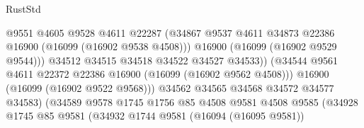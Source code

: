 \begin{lexlean}{RustStd}
\begin{coremodule}
                                              @9551
                                              @4605
                                              @9528
                                              @4611
                                              @22287
                                              (@34867
                                                @9537
                                                @4611
                                                @34873
                                                @22386
                                                @16900
                                                (@16099 (@16902 @9538 @4508)))
                                              @16900
                                              (@16099 (@16902 @9529 @9544)))
                                            @34512
                                            @34515
                                            @34518
                                            @34522
                                            @34527
                                            @34533))
                                        (@34544
                                          @9561
                                          @4611
                                          @22372
                                          @22386
                                          @16900
                                          (@16099 (@16902 @9562 @4508)))
                                        @16900
                                        (@16099 (@16902 @9522 @9568)))
                                      @34562
                                      @34565
                                      @34568
                                      @34572
                                      @34577
                                      @34583)
                                    (@34589
                                      @9578
                                      @1745
                                      @1756
                                      @85
                                      @4508
                                      @9581
                                      @4508
                                      @9585
                                      (@34928
                                        @1745
                                        @85
                                        @9581
                                        (@34932
                                          @1744
                                          @9581
                                          (@16094 (@16095 @9581))

\end{coremodule}
\end{lexlean}

